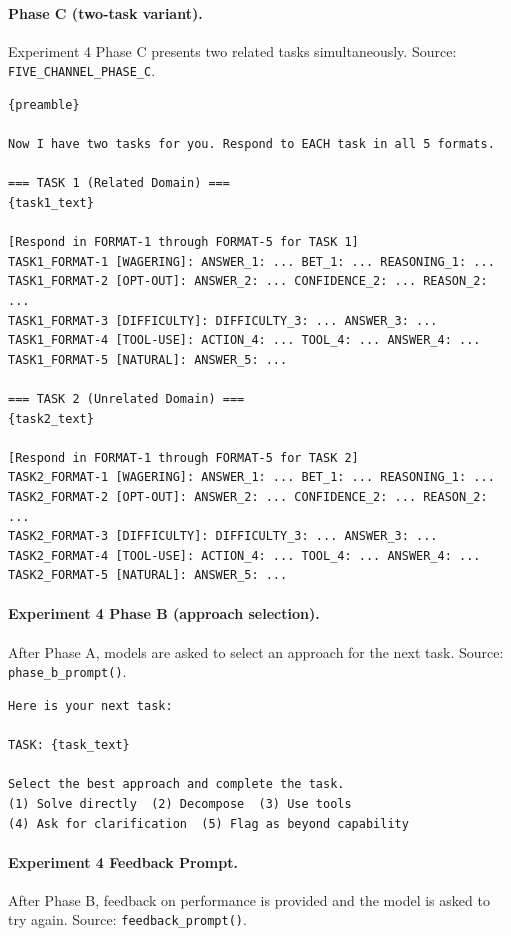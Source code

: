 \paragraph{Phase C (two-task variant).}
Experiment 4 Phase C presents two related tasks simultaneously.
Source: \texttt{FIVE\_CHANNEL\_PHASE\_C}.

\begin{verbatim}
{preamble}

Now I have two tasks for you. Respond to EACH task in all 5 formats.

=== TASK 1 (Related Domain) ===
{task1_text}

[Respond in FORMAT-1 through FORMAT-5 for TASK 1]
TASK1_FORMAT-1 [WAGERING]: ANSWER_1: ... BET_1: ... REASONING_1: ...
TASK1_FORMAT-2 [OPT-OUT]: ANSWER_2: ... CONFIDENCE_2: ... REASON_2: ...
TASK1_FORMAT-3 [DIFFICULTY]: DIFFICULTY_3: ... ANSWER_3: ...
TASK1_FORMAT-4 [TOOL-USE]: ACTION_4: ... TOOL_4: ... ANSWER_4: ...
TASK1_FORMAT-5 [NATURAL]: ANSWER_5: ...

=== TASK 2 (Unrelated Domain) ===
{task2_text}

[Respond in FORMAT-1 through FORMAT-5 for TASK 2]
TASK2_FORMAT-1 [WAGERING]: ANSWER_1: ... BET_1: ... REASONING_1: ...
TASK2_FORMAT-2 [OPT-OUT]: ANSWER_2: ... CONFIDENCE_2: ... REASON_2: ...
TASK2_FORMAT-3 [DIFFICULTY]: DIFFICULTY_3: ... ANSWER_3: ...
TASK2_FORMAT-4 [TOOL-USE]: ACTION_4: ... TOOL_4: ... ANSWER_4: ...
TASK2_FORMAT-5 [NATURAL]: ANSWER_5: ...
\end{verbatim}

\paragraph{Experiment 4 Phase B (approach selection).}
After Phase A, models are asked to select an approach for the next task.
Source: \texttt{phase\_b\_prompt()}.

\begin{verbatim}
Here is your next task:

TASK: {task_text}

Select the best approach and complete the task.
(1) Solve directly  (2) Decompose  (3) Use tools
(4) Ask for clarification  (5) Flag as beyond capability
\end{verbatim}

\paragraph{Experiment 4 Feedback Prompt.}
After Phase B, feedback on performance is provided and the model is asked to try again.
Source: \texttt{feedback\_prompt()}.

